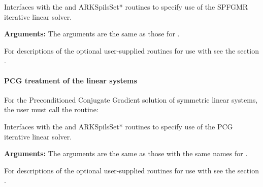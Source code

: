 \documentclass[letterpaper,10pt,english]{sphinxmanual}
\begin{document}
\begin{fulllineitems}
\label{f_interface/Usage:f/_/FARKSPFGMR}
Interfaces with the {\hyperref[c_interface/User_callable:c.ARKSpfgmr]{\emph{}}} and
ARKSpilsSet* routines to specify use of the SPFGMR iterative
linear solver.

\textbf{Arguments:}  The arguments are the same as those for
{\hyperref[f_interface/Usage:f/_/FARKSPGMR]{\emph{}}}.

\end{fulllineitems}


For descriptions of the optional user-supplied routines for use with
{\hyperref[f_interface/Usage:f/_/FARKSPFGMR]{\emph{}}} see the section {\hyperref[f_interface/Usage:finterface-spilsusersupplied]{\emph{}}}.


\paragraph{PCG treatment of the linear systems}
\label{f_interface/Usage:pcg-treatment-of-the-linear-systems}
For the Preconditioned Conjugate Gradient solution of symmetric linear
systems, the user must call the {\hyperref[f_interface/Usage:f/_/FARKPCG]{\emph{}}} routine:

\begin{fulllineitems}
\label{f_interface/Usage:f/_/FARKPCG}
Interfaces with the {\hyperref[c_interface/User_callable:c.ARKPcg]{\emph{}}} and
ARKSpilsSet* routines to specify use of the PCG iterative
linear solver.

\textbf{Arguments:}  The arguments are the same as those with the
same names for {\hyperref[f_interface/Usage:f/_/FARKSPGMR]{\emph{}}}.

\end{fulllineitems}


For descriptions of the optional user-supplied routines for use with
{\hyperref[f_interface/Usage:f/_/FARKPCG]{\emph{}}} see the section {\hyperref[f_interface/Usage:finterface-spilsusersupplied]{\emph{}}}.
\end{document}
